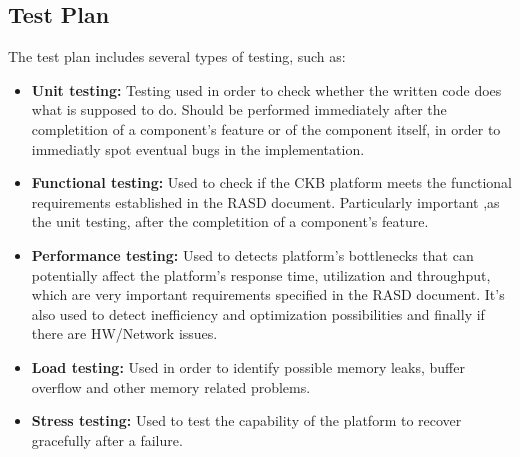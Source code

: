 \documentclass{article}
\begin{document}
{    \subsection{Test Plan}
        The test plan includes several types of testing, such as:
        \begin{itemize}
            \item \textbf{Unit testing:} Testing used in order to check whether the 
            written code does what is supposed to do. Should be performed immediately after the
            completition of a component's feature or of the component itself, in order to 
            immediatly spot eventual bugs in the implementation.
            \item \textbf{Functional testing:} Used to check if the CKB platform meets the
            functional requirements established in the RASD document. Particularly important
            ,as the unit testing, after the completition of a component's feature.
            \item \textbf{Performance testing:} Used to detects platform's bottlenecks that
            can potentially affect the platform's response time, utilization and throughput, which
            are very important requirements specified in the RASD document.
            It's also used to detect inefficiency and optimization possibilities and finally
            if there are HW/Network issues.
            \item \textbf{Load testing:} Used in order to identify possible memory leaks, buffer
            overflow and other memory related problems.
            \item \textbf{Stress testing:} Used to test the capability of the platform to 
            recover gracefully after a failure.
        \end{itemize}

\newpage
\pagestyle{EffortSpentStyle}
}
\end{document}

